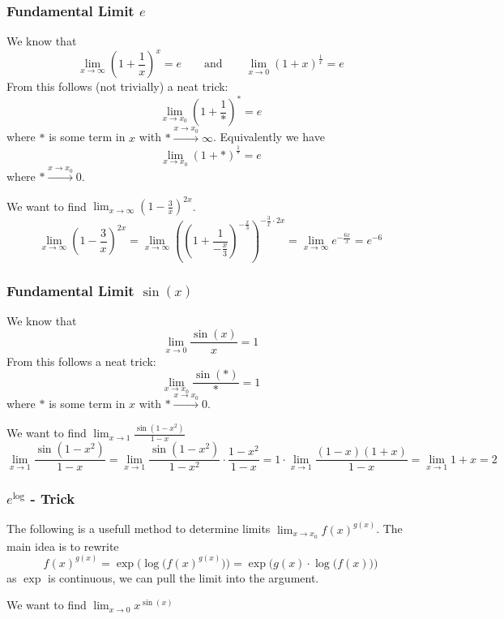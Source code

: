\subsubsection{Fundamental Limit \(e\)}
We know that
\[\lim_{x \to \infty} \left(1 + \frac{1}{x}\right)^x = e \qquad\text{and}\qquad \lim_{x \to 0} (1 + x)^{\frac{1}{x}} = e\]
From this follows (not trivially) a neat trick:
\[\lim_{x \to x_0} \left(1 + \frac{1}{\ast}\right)^* = e\]
where \(\ast\) is some term in \(x\) with \(\ast \xrightarrow{x \to x_0} \infty\).
Equivalently we have
\[\lim_{x \to x_0} (1 + \ast)^{\frac{1}{\ast}} = e\]
where \(\ast \xrightarrow{x \to x_0} 0\).
\begin{example}
   We want to find \(\lim_{x \to \infty} \left(1 - \frac{3}{x}\right)^{2x}\).
   \[\lim_{x \to \infty} \left(1 - \frac{3}{x}\right)^{2x} = \lim_{x \to \infty} \left(\left(1 + \frac{1}{-\frac{x}{3}}\right)^{-\frac{x}{3}}\right)^{-\frac{3}{x} \cdot 2x} = \lim_{x \to \infty} e^{-\frac{6x}{x}} = e^{-6}\]
\end{example}

\subsubsection{Fundamental Limit \(\sin(x)\)}
We know that
\[\lim_{x \to 0} \frac{\sin(x)}{x} = 1\]
From this follows a neat trick:
\[\lim_{x \to x_0} \frac{\sin(\ast)}{\ast} = 1\]
where \(\ast\) is some term in \(x\) with \(\ast \xrightarrow{x \to x_0} 0\).
\begin{example}
   We want to find \(\lim_{x \to 1} \frac{\sin(1-x^2)}{1-x}\)
   \[\lim_{x \to 1} \frac{\sin(1-x^2)}{1-x} = \lim_{x \to 1}\frac{\sin(1-x^2)}{1-x^2} \cdot \frac{1-x^2}{1-x} = 1 \cdot \lim_{x \to 1} \frac{(1-x)(1+x)}{1-x} = \lim_{x \to 1} 1 + x = 2\]
\end{example}

\subsubsection{\(e^{\log}\) - Trick}
The following is a usefull method to determine limits \(\lim_{x \to x_0} f(x)^{g(x)}\).
The main idea is to rewrite
\[f(x)^{g(x)} = \exp\Big(\log\big(f(x)^{g(x)}\big)\Big) = \exp\Big(g(x) \cdot \log\big(f(x)\big)\Big)\]
as \(\exp\) is continuous, we can pull the limit into the argument.
\begin{example}
   We want to find \(\lim_{x \to 0} x^{\sin(x)}\)
\end{example}

